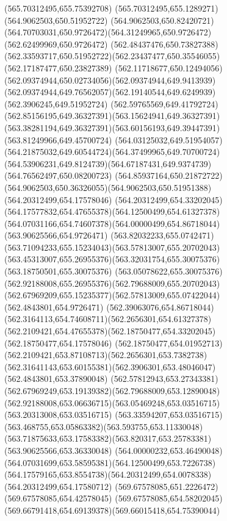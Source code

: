 {{	\lineto(565.70312495,655.75392708)
	\lineto(565.70312495,655.1289271)
	\closepath
	\moveto(564.9062503,650.51952722)
	\curveto(564.9062503,650.82420721)(564.70703031,650.9726472)(564.31249965,650.9726472)
	\lineto(562.62499969,650.9726472)
	\lineto(562.48437476,650.73827388)
	\curveto(562.33593717,650.51952722)(562.23437477,650.35546055)(562.17187477,650.23827389)
	\curveto(562.11718677,650.12494056)(562.09374944,650.02734056)(562.09374944,649.9413939)
	\curveto(562.09374944,649.76562057)(562.19140544,649.6249939)(562.3906245,649.51952724)
	\curveto(562.59765569,649.41792724)(562.85156195,649.36327391)(563.15624941,649.36327391)
	\curveto(563.38281194,649.36327391)(563.60156193,649.39447391)(563.81249966,649.45700724)
	\curveto(564.03125032,649.51954057)(564.21875032,649.60544724)(564.37499965,649.70700724)
	\curveto(564.53906231,649.8124739)(564.67187431,649.9374739)(564.76562497,650.08200723)
	\curveto(564.85937164,650.21872722)(564.9062503,650.36326055)(564.9062503,650.51951388)
	\closepath
	\moveto(564.20312499,654.17578046)
	\curveto(564.20312499,654.33202045)(564.17577832,654.47655378)(564.12500499,654.61327378)
	\curveto(564.07031166,654.74607378)(564.00000499,654.86718044)(563.90625566,654.9726471)
	\curveto(563.82032233,655.0742471)(563.71094233,655.15234043)(563.57813007,655.20702043)
	\curveto(563.45313007,655.26955376)(563.32031754,655.30075376)(563.18750501,655.30075376)
	\curveto(563.05078622,655.30075376)(562.92188008,655.26955376)(562.79688009,655.20702043)
	\curveto(562.67969209,655.15235377)(562.57813009,655.07422044)(562.4843801,654.9726471)
	\curveto(562.39063076,654.86718044)(562.3164113,654.74608711)(562.2656301,654.61327378)
	\curveto(562.2109421,654.47655378)(562.18750477,654.33202045)(562.18750477,654.17578046)
	\curveto(562.18750477,654.01952713)(562.2109421,653.87108713)(562.2656301,653.7382738)
	\curveto(562.31641143,653.60155381)(562.3906301,653.48046047)(562.4843801,653.37890048)
	\curveto(562.57812943,653.27343381)(562.67969249,653.19139382)(562.79688009,653.12890048)
	\curveto(562.92188008,653.06636715)(563.05469248,653.03516715)(563.20313008,653.03516715)
	\curveto(563.33594207,653.03516715)(563.468755,653.05863382)(563.593755,653.11330048)
	\curveto(563.71875633,653.17583382)(563.820317,653.25783381)(563.90625566,653.36330048)
	\curveto(564.00000232,653.46490048)(564.07031699,653.58595381)(564.12500499,653.7226738)
	\curveto(564.17579165,653.8554738)(564.20312499,654.0078338)(564.20312499,654.17580712)
	\closepath
	\moveto(569.67578085,651.2226472)
	\lineto(569.67578085,654.42578045)
	\curveto(569.67578085,654.58202045)(569.66791418,654.69139378)(569.66015418,654.75390044)
}}
